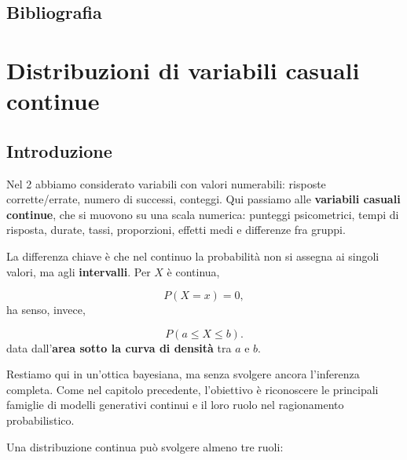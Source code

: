 \documentclass[
  italian,
  letterpaper,
  a4paper,
  11pt,
  open=any]{scrbook}
\theoremstyle{plain}
\theoremstyle{definition}
\theoremstyle{definition}
\theoremstyle{remark}
\begin{document}
\section*{Bibliografia}\label{bibliografia-5}


\chapter{Distribuzioni di variabili casuali
continue}\label{sec-prob-cont-distr}

\section*{Introduzione}\label{introduzione-11}


Nel 2 abbiamo considerato variabili con valori numerabili: risposte
corrette/errate, numero di successi, conteggi. Qui passiamo alle
\textbf{variabili casuali continue}, che si muovono su una scala
numerica: punteggi psicometrici, tempi di risposta, durate, tassi,
proporzioni, effetti medi e differenze fra gruppi.

La differenza chiave è che nel continuo la probabilità non si assegna ai
singoli valori, ma agli \textbf{intervalli}. Per \(X\) è continua,

\[
P(X = x) = 0,
\] ha senso, invece,

\[
P(a \leq X \leq b).
\] data dall'\textbf{area sotto la curva di densità} tra \(a\) e \(b\).

Restiamo qui in un'ottica bayesiana, ma senza svolgere ancora
l'inferenza completa. Come nel capitolo precedente, l'obiettivo è
riconoscere le principali famiglie di modelli generativi continui e il
loro ruolo nel ragionamento probabilistico.

Una distribuzione continua può svolgere almeno tre ruoli:
\end{document}
